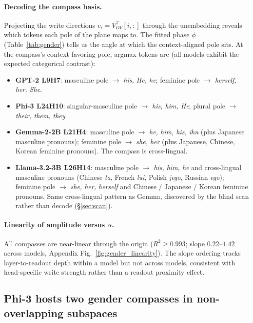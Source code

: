 \paragraph{Decoding the compass basis.} Projecting the write
directions $v_i = V^{\top}_{OV}[i, :]$ through the unembedding reveals
which tokens each pole of the plane maps to. The fitted phase $\phi$
(Table~\ref{tab:gender}) tells us the angle at which the
context-aligned pole sits. At the compass's context-favoring pole,
argmax tokens are (all models exhibit the expected categorical
contrast):
\begin{itemize}
    \item \textbf{GPT-2 L9H7}: masculine pole $\to$ \emph{his, He, he};
    feminine pole $\to$ \emph{herself, her, She}.
    \item \textbf{Phi-3 L24H10}: singular-masculine pole $\to$
    \emph{his, him, He}; plural pole $\to$ \emph{their, them, they}.
    \item \textbf{Gemma-2-2B L21H4}: masculine pole $\to$
    \emph{he, him, his, ihn} (plus Japanese masculine pronouns);
    feminine pole $\to$ \emph{she, her} (plus Japanese, Chinese,
    Korean feminine pronouns). The compass is cross-lingual.
    \item \textbf{Llama-3.2-3B L26H14}: masculine pole $\to$
    \emph{his, him, he} and cross-lingual masculine pronouns
    (Chinese \emph{ta}, French \emph{lui}, Polish \emph{jego},
    Russian \emph{ego}); feminine pole $\to$ \emph{she, her,
    herself} and Chinese / Japanese / Korean feminine pronouns.
    Same cross-lingual pattern as Gemma, discovered by the blind
    scan rather than decode (\S\ref{sec:scan}).
\end{itemize}

\paragraph{Linearity of amplitude versus $\alpha$.} All compasses are
near-linear through the origin ($R^2 \ge 0.993$; slope $0.22$--$1.42$
across models, Appendix Fig.~\ref{fig:gender_linearity}). The slope
ordering tracks layer-to-readout depth within a model but not across
models, consistent with head-specific write strength rather than a
readout proximity effect.


\subsection{Phi-3 hosts two gender compasses in non-overlapping subspaces}
\label{sec:phi3_two}

